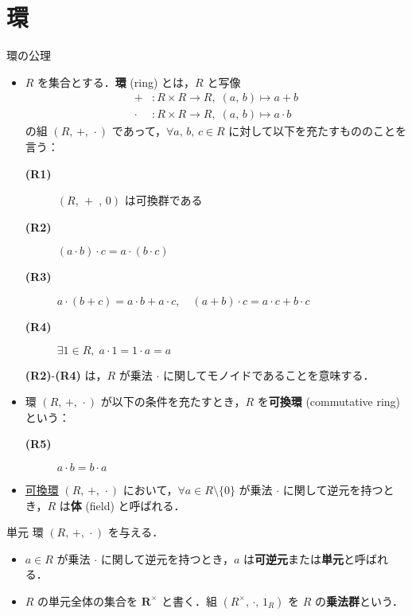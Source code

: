 \documentclass[geometry_main]{subfiles}
\begin{document}
\section{環}

\begin{myaxiom}[label=ax:ring]{環の公理}
	\begin{itemize}
		\item $R$ を集合とする．\textbf{環} (ring) とは，$R$ と写像
		\begin{align}
			+&\colon R\times R \to R,\; (a,\, b) \mapsto a+b \\
			\cdot\mathrel{}&\colon R\times R \to R,\; (a,\, b) \mapsto a\cdot b
		\end{align}
		の組 $(R,\, +,\,\cdot\mathrel{})$ であって，$\forall a,\, b,\, c \in R$ に対して以下を充たすもののことを言う：
		\begin{description}
			\item[\textbf{(R1)}] $(R,\, +\;,\, 0)$ は可換群である
			\item[\textbf{(R2)}] $(a\cdot b)\cdot c = a\cdot (b\cdot c)$
			\item[\textbf{(R3)}] $a \cdot (b+c) = a \cdot b + a \cdot c,\quad (a+b)\cdot c = a\cdot c + b\cdot c$
			\item[\textbf{(R4)}] $\exists 1 \in R,\; a\cdot 1 = 1 \cdot a = a$
		\end{description}
		\textbf{(R2)}-\textbf{(R4)} は，$R$ が乗法 $\cdot$ に関してモノイドであることを意味する．
		
		\item 環 $(R,\, +,\, \cdot\mathrel{})$ が以下の条件を充たすとき，$R$ を\textbf{可換環} (commutative ring) という：
		\begin{description}
			\item[\textbf{(R5)}] $a\cdot b= b\cdot a$
		\end{description}
		\item \underline{可換環} $(R,\, +,\, \cdot \mathrel{})$ において，$\forall a \in R\setminus \{0\}$ が乗法 $\cdot$ に関して逆元を持つとき，$R$ は\textbf{体} (field) と呼ばれる．
	\end{itemize}
\end{myaxiom}

\begin{mydef}[label=def:zero-ring]{単元}
	環 $(R,\, +,\, \cdot\mathrel{})$ を与える．
	\begin{itemize}
		\item $a \in R$ が乗法 $\cdot$ に関して逆元を持つとき，$a$ は\textbf{可逆元}または\textbf{単元}と呼ばれる．
		\item $R$ の単元全体の集合を $\bm{R^\times}$ と書く．組 $(R^\times,\, \cdot,\, 1_R)$ を $R$ の\textbf{乗法群}という．
	\end{itemize}
\end{mydef}
\end{document}

